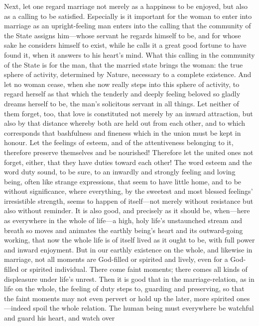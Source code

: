\documentclass[12pt,a4paper]{book}
\begin{document}
Next, let one regard marriage not merely as a happiness to be enjoyed, but
also as a calling to be satisfied. Especially is it important for the woman
to enter into marriage as an upright-feeling man enters into the calling
that the community of the State assigns him---whose servant he regards
himself to be, and for whose sake he considers himself to exist, while he
calls it a great good fortune to have found it, when it answers to his
heart's mind. What this calling in the community of the State is for the
man, that the married state brings the woman: the true sphere of activity,
determined by Nature, necessary to a complete existence. And let no woman
cease, when she now really steps into this sphere of activity, to regard
herself as that which the tenderly and deeply feeling beloved so gladly
dreams herself to be, the man's solicitous servant in all things. Let
neither of them forget, too, that love is constituted not merely by an
inward attraction, but also by that distance whereby both are held out from
each other, and to which corresponds that bashfulness and fineness which in
the union must be kept in honour. Let the feelings of esteem, and of the
attentiveness belonging to it, therefore preserve themselves and be
nourished! Therefore let the united ones not forget, either, that they have
duties toward each other! The word esteem and the word duty sound, to be
sure, to an inwardly and strongly feeling and loving being, often like
strange expressions, that seem to have little home, and to be without
significance, where everything, by the sweetest and most blessed feelings'
irresistible strength, seems to happen of itself---not merely without
resistance but also without reminder. It is also good, and precisely as it
should be, when---here as everywhere in the whole of life---a high, holy
life's unstaunched stream and breath so moves and animates the earthly
being's heart and its outward-going working, that now the whole life is of
itself lived as it ought to be, with full power and inward enjoyment. But
in our earthly existence on the whole, and likewise in marriage, not all
moments are God-filled or spirited and lively, even for a God-filled or
spirited individual. There come faint moments; there comes all kinds of
displeasure under life's unrest. Then it is good that in the
marriage-relation, as in life on the whole, the feeling of duty steps to,
guarding and preserving, so that the faint moments may not even pervert or
hold up the later, more spirited ones---indeed spoil the whole relation. The
human being must everywhere be watchful and guard his heart, and watch over
\end{document}
